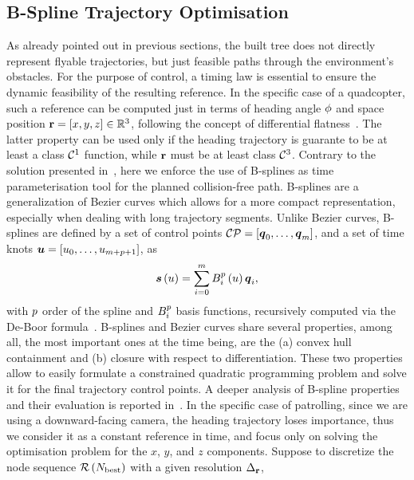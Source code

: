 \subsection{B-Spline Trajectory Optimisation}%
\label{SEC:SEARCH-TRAJECTORY-OPTIMISATION}
As already pointed out in previous sections, the built tree does not directly represent flyable trajectories, but just feasible paths
through the environment's obstacles. For the purpose of control, a timing law is essential to ensure the dynamic feasibility of the resulting
reference. In the specific case of a quadcopter, such a reference can be computed just in terms of heading angle $\phi$ and space position
$\mathbf{r} = \left[ x, y, z \right] \in \mathbb{R}^3$, following the concept of differential flatness~\cite{mellinger2011minimum}. The latter property can
be used only if the heading trajectory is guarante to be at least a class $\mathcal{C}^1$ function, while $\mathbf{r}$ must be at least class $\mathcal{C}^3$.
Contrary to the solution presented in~, here we enforce the use of B-splines as time parameterisation
tool for the planned collision-free path. B-splines are a generalization of B\acuteacc ezier curves which allows for a more compact
representation, especially when dealing with long trajectory segments. Unlike B\acuteacc ezier curves, B-splines are defined by a
set of control points $\mathcal{CP} = \left[ \boldsymbol{q}_0, \dots, \boldsymbol{q}_{m} \right]$, and a set of time knots
$\boldsymbol{u} = \left[ u_0, \dots, u_{m + p + 1} \right]$, as
\begin{equation*}
	\boldsymbol{s} \left( u \right) = \sum_{i=0}^m B_i^p \left( u \right) \boldsymbol{q}_i,
\end{equation*}
with $p$ order of the spline and $B_i^p$ basis functions, recursively computed via the De-Boor formula~\cite{de1978practical}.
B-splines and B\acuteacc ezier curves share several properties, among all, the most important ones at the time being, are the
(a) convex hull containment and (b) closure with respect to differentiation. These two properties allow to easily formulate
a constrained quadratic programming problem and solve it for the final trajectory control points. A deeper analysis of B-spline properties and
their evaluation is reported in~. In the specific case of patrolling, since we are using a downward-facing camera, the
heading trajectory loses importance, thus we consider it as a constant reference in time, and focus only on solving the optimisation problem
for the $x$, $y$, and $z$ components. Suppose to discretize the node sequence $\mathcal{R} \left( N_{\text{best}} \right)$ with a given resolution $\Delta_{\mathbf{r}}$,
